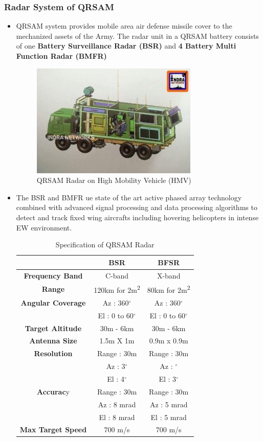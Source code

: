 \documentclass[14pt]{article} %
\begin{document}
\subsubsection{Radar System of QRSAM}
\begin{itemize}
\item QRSAM system provides mobile area air defense missile cover to the mechanized assets of the Army. The radar unit in a QRSAM battery consists of one \textbf{Battery Surveillance Radar (BSR)} and \textbf{4 Battery Multi Function Radar (BMFR)}
 \begin{figure}[H]
 \centering
    \includegraphics[width=0.7\linewidth]{qrsamradar.jpg}
  \caption{QRSAM Radar on High Mobility Vehicle (HMV)}
  \label{fig:figure 3}
\end{figure}
\item The BSR and BMFR ue state of the art active phased array technology combined with advanced signal processing and data processing algorithms to detect and track fixed wing aircrafts including hovering helicopters in intense EW environment.
\begin{table}[H]
\centering
\begin{tabular}{|c |c |c| }\toprule
&\textbf{BSR} & \textbf{BFSR}\\ \midrule
\textbf{Frequency Band} & C-band & X-band \\ \midrule
\textbf{Range} & 120km for 2m\textsuperscript{2} & 80km for 2m\textsuperscript{2} \\ \midrule
\textbf{Angular Coverage} & Az : 360$^{\circ}$ & Az : 360$^{\circ}$ \\ 
& El : 0 to 60$^{\circ}$ & El : 0 to 60$^{\circ}$\\ \midrule
\textbf{Target Altitude} & 30m - 6km & 30m - 6km\\ \midrule
\textbf{Antenna Size} & 1.5m X 1m & 0.9m x 0.9m\\ \midrule
\textbf{Resolution} & Range : 30m& Range : 30m\\ \midrule
&Az : 3$^{\circ}$ & Az : $^{\circ}$\\
&El : 4$^{\circ}$ & El : 3$^{\circ}$\\ \midrule
\textbf{Accurac}y & Range : 30m & Range : 30m\\ 
&Az : 8 mrad & Az : 5 mrad\\
&El : 8 mrad & El : 5 mrad\\ \midrule
\textbf{Max Target Speed} & 700 m/s & 700 m/s\\ \bottomrule
\end{tabular}
\caption{Specification of QRSAM Radar}
\end{table}



\end{itemize}
\end{document}
